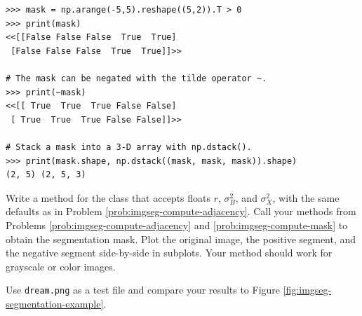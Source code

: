 \begin{lstlisting}
>>> mask = np.arange(-5,5).reshape((5,2)).T > 0
>>> print(mask)
<<[[False False False  True  True]
 [False False False  True  True]]>>

# The mask can be negated with the tilde operator ~.
>>> print(~mask)
<<[[ True  True  True False False]
 [ True  True  True False False]]>>

# Stack a mask into a 3-D array with np.dstack().
>>> print(mask.shape, np.dstack((mask, mask, mask)).shape)
(2, 5) (2, 5, 3)
\end{lstlisting}

\begin{problem}
Write a method for the  class that accepts floats $r$, $\sigma_B^2$, and $\sigma_X^2$, with the same defaults as in Problem \ref{prob:imgseg-compute-adjacency}.
Call your methods from Problems \ref{prob:imgseg-compute-adjacency} and \ref{prob:imgseg-compute-mask} to obtain the segmentation mask.
Plot the original image, the positive segment, and the negative segment side-by-side in subplots.
Your method should work for grayscale or color images.

Use \texttt{dream.png} as a test file and compare your results to Figure \ref{fig:imgseg-segmentation-example}.
\end{problem}

